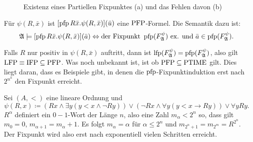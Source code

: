 \begin{figure}[h]
	\hspace{2cm}
	\caption{Existenz eines Partiellen Fixpunktes (a) und das Fehlen davon (b)}
\end{figure}

Für $\psi(R,\bar{x})$ ist $[\operatorname{pfp} R\bar{x}.\psi(R,\bar{x})](\bar{u})$ eine $\operatorname{PFP}$-Formel. 
Die Semantik dazu ist: $$\mathfrak{A}\models [\operatorname{pfp} R\bar{x} . \psi(R,\bar{x})](\bar{a}) \Leftrightarrow \text{der Fixpunkt } \operatorname{pfp}(F^\psi_{\mathfrak{A}}) \text{ ex. und } \bar{a} \in \operatorname{pfp}(F^\psi_{\mathfrak{A}}).$$

Falls $R$ nur positiv in $\psi(R,\bar{x})$ auftritt, dann ist $\operatorname{lfp}(F^\psi_{\mathfrak{A}})=\operatorname{pfp}(F^\psi_{\mathfrak{A}})$, also gilt $\operatorname{LFP} \equiv \operatorname{IFP} \subseteq \operatorname{PFP}$. Was noch unbekannt ist, ist ob $\operatorname{PFP}\subseteq \operatorname{PTIME}$ gilt. Dies liegt daran, dass es Beispiele gibt, in denen die $\operatorname{pfp}$-Fixpunktinduktion erst nach $2^{n^k}$ den Fixpunkt erreicht.

Sei $(A,<)$ eine lineare Ordnung und 
\[\psi(R,x)\coloneqq (Rx \land \exists y (y<x \land \neg Ry)) \lor (\neg Rx \land \forall y (y<x \rightarrow Ry)) \lor \forall y Ry.\]
$R^\alpha$ definiert ein $0-1$-Wort der Länge $n$, also eine Zahl $m_\alpha<2^n$ so, dass gilt $m_0=0$, $m_{\alpha+1}=m_\alpha+1$. Es folgt $m_\alpha = \alpha$ für $\alpha \leq 2^n$ und $m_{2^n+1}=m_{2^m}=R^{2^n}$. Der Fixpunkt wird also erst nach exponentiell vielen Schritten erreicht.

